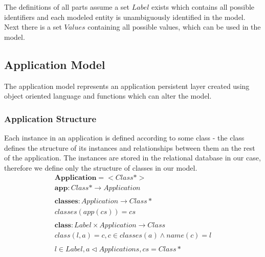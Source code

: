 \documentclass[11pt]{article}
\begin{document}
The definitions of all parts assume a set $Label$ exists which contains all possible identifiers and each modeled entity is unambiguously identified in the model. Next there is a set $Values$ containing all possible values, which can be used in the model. 

\subsection{Application Model}
\label{sec:appModel}
The application model represents an application persistent layer created using object oriented language and functions which can alter the model. 
\subsubsection{Application Structure}
Each instance in an application is defined according to some class - the class defines the structure of its instances and relationships between them an the rest of the application. The instances are stored in the relational database in our case, therefore we define only the structure of classes in our model. 
\begin{align*}
  \mathbf{Application} = < Class* > \\ 
  \mathbf{app} : Class* \rightarrow  Application \\ \\
  \mathbf{classes} : Application \rightarrow Class* \\
  classes(app(cs)) = cs  \\\\
  \mathbf{class} : Label \times Application \rightarrow Class   \\ 
  class(l, a) = c, c \in classes(a) \wedge name(c) = l \\ \\
  l \in Label,a \lhd Applications, cs = Class* 
\end{align*}
\end{document}
